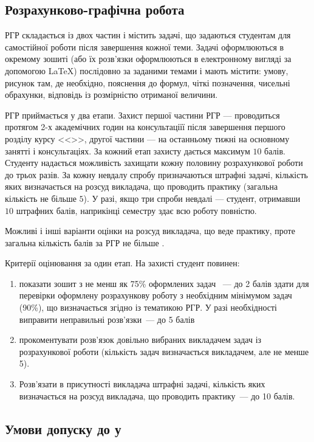 \documentclass{Syllabus}
\begin{document}
\subsection*{Розрахунково-графічна робота}


РГР складається із двох частин і містить задачі, що задаються студентам для самостійної роботи після завершення кожної теми. Задачі оформлюються в окремому зошиті (або їх розв'язки оформлюються в електронному вигляді за допомогою \LaTeX{}) послідовно за заданими темами і мають містити: умову, рисунок там, де необхідно, пояснення до формул, чіткі позначення, чисельні обрахунки, відповідь із розмірністю отриманої величини.

РГР приймається у два етапи. Захист першої частини РГР --- проводиться протягом 2-х академічних годин на консультаціїї після завершення першого розділу курсу <<\discipline>>, другої частини --- на останньому тижні на основному занятті і консультаціях. За кожний етап захисту дається максимум $10$ балів. Студенту надається можливість захищати кожну половину розрахункової роботи до трьох разів. За кожну невдалу спробу призначаються штрафні задачі, кількість яких визначається на розсуд викладача, що проводить практику (загальна кількість не більше $5$). У разі, якщо три спроби невдалі --- студент, отримавши $10$ штрафних балів, наприкінці семестру здає всю роботу повністю.


Можливі і інші варіанти оцінки на розсуд викладача, що веде практику, проте загальна кількість балів за РГР не більше \rgrBal.

Критерії оцінювання за один етап. На захисті студент повинен:
\begin{enumerate}[label=$\bullet$]
	\item показати зошит з не менш як 75\% оформлених задач~ --- до 2 балів
	      здати для перевірки оформлену розрахункову роботу з необхідним мінімумом задач (90\%), що визначається згідно із тематикою РГР. У разі необхідності виправити неправильні розв’язки~--- до 5 балів
	\item прокоментувати розв’язок довільно вибраних викладачем задач із розрахункової роботи (кількість задач визначається викладачем, але не менше 5).
	\item  Розв’язати в присутності викладача штрафні задачі, кількість яких визначається на розсуд викладача, що проводить практику~--- до 10 балів.
\end{enumerate}


\subsection*{Умови допуску до \control у}
\end{document}
